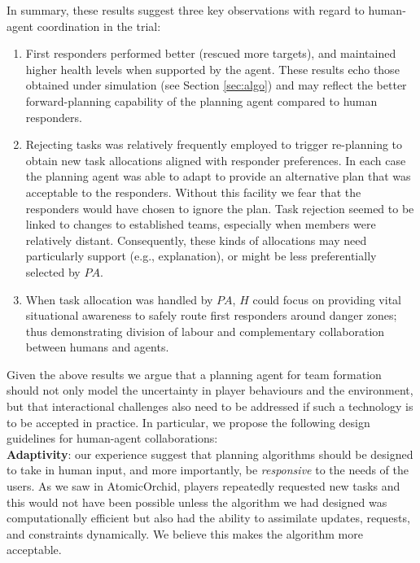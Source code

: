 In summary, these results suggest three key observations with regard to  human-agent coordination in the trial:\vspace{-2mm}
\begin{enumerate}
\item First responders performed better (rescued more targets), and maintained higher health levels when supported by the agent.  These results echo those obtained under simulation (see Section \ref{sec:algo}) and  may reflect the better forward-planning capability of the planning agent compared to human responders. 
 
\item Rejecting tasks was relatively frequently employed to trigger re-planning to obtain new task allocations aligned with responder preferences.  In each case the planning agent was able to adapt to provide an alternative plan that was acceptable to the responders. Without this facility we fear that the responders would have chosen to ignore the plan. Task rejection seemed to be linked to changes to established teams, especially when members were relatively distant. Consequently, these kinds of allocations may need particularly support (e.g., explanation), or might be less preferentially selected by $PA$.

\item When task allocation was handled by $PA$, $H$ could focus on providing vital situational awareness to safely route first responders around danger zones; thus demonstrating division of labour and complementary collaboration between humans and agents.
\end{enumerate}

Given the above results we argue that a planning agent for team formation should not only model the uncertainty in player behaviours and the environment, but that interactional challenges also need to be addressed  if such a technology is to be accepted in practice. In particular, we propose the following design guidelines for human-agent collaborations:\\

\noindent \textbf{Adaptivity}: our experience suggest that planning algorithms should be designed to take in human input, and more importantly, be \emph{responsive} to the needs of the users. As we saw in AtomicOrchid, players repeatedly requested new tasks and this would not have been possible unless the algorithm we had designed was computationally efficient but also had the ability to assimilate updates, requests, and constraints dynamically. We believe this makes the algorithm more acceptable.\\


